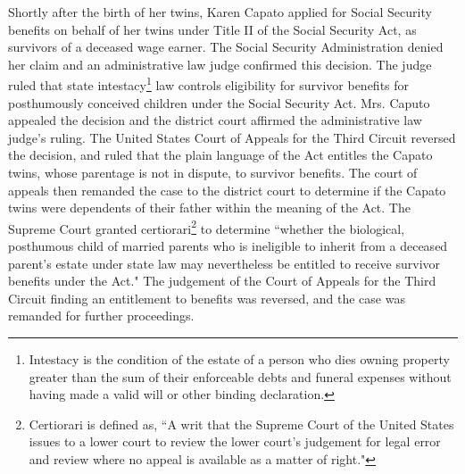 \documentclass[letterpaper,10pt,twoside]{article}
\begin{document}
Shortly after the birth of her twins, Karen Capato applied for Social Security benefits on behalf of her twins under Title II of the Social Security Act, as survivors of a deceased wage earner. The Social Security Administration denied her claim and an administrative law judge confirmed this decision.  The judge ruled that state intestacy\footnote{Intestacy is the condition of the estate of a person who dies owning property greater than the sum of their enforceable debts and funeral expenses without having made a valid will or other binding declaration.} law controls eligibility for survivor benefits for posthumously conceived children under the Social Security Act.  Mrs. Caputo appealed the decision and the district court affirmed the administrative law judge's ruling.  The United States Court of Appeals for the Third Circuit reversed the decision, and ruled that the plain language of the Act entitles the Capato twins, whose parentage is not in dispute, to survivor benefits.  The court of appeals then remanded the case to the district court to determine if the Capato twins were dependents of their father within the meaning of the Act. The Supreme Court granted certiorari\footnote{Certiorari is defined as, ``A writ that the Supreme Court of the United States issues to a lower court to review the lower court's judgement for legal error and review where no appeal is available as a matter of right."} to determine ``whether the biological, posthumous child of married parents who is ineligible to inherit from a deceased parent's estate under state law may nevertheless be entitled to receive survivor benefits under the Act."  The judgement of the Court of Appeals for the Third Circuit finding an entitlement to benefits was reversed, and the case was remanded for further proceedings.
\end{document}

